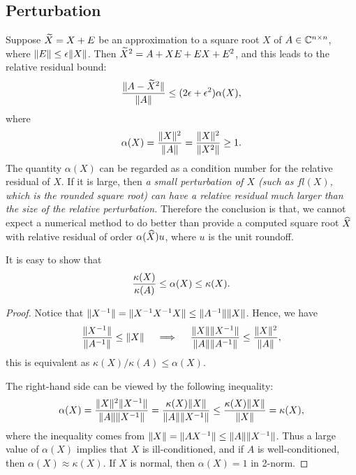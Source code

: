 \documentclass{article}
\begin{document}
\subsection{Perturbation}
Suppose $\widetilde X = X + E$ be an approximation to a square root $X$ of
$A\in\mathbb{C}^{n\times n}$, where $\|{E}\| \le \epsilon\|{X}\|$. Then $\widetilde X^2 = A + XE
+ EX + E^2$, and this leads to the relative residual bound:
\begin{equation}\notag
  \frac{\|{A - \widetilde X^2}\|}{\|{A}\|} \leq (2\epsilon +
  \epsilon^2)\alpha(X), 
\end{equation}
where
\begin{equation}\label{eq:rel-residual-err-bound}
  \alpha(X) = \frac{\|{X}\|^2}{\|{A}\|} = \frac{\|{X}\|^2}{\|{X^2}\|}
  \ge 1. 
\end{equation}
The quantity $\alpha(X)$ can be regarded as a condition number for the
relative residual of $X$. If it is large, then \emph{a small perturbation
  of $X$ (such as $fl(X)$, which is the rounded square root) can have a
  relative residual much larger than the size of the relative perturbation.} 
Therefore the conclusion is that, we cannot expect a numerical method to do
better than provide a computed square root $\widehat X$ with relative residual
of order $\alpha(\widehat X) u$, where $u$ is the unit roundoff.

It is easy to show that 
\begin{equation}\notag
  \frac{\kappa(X)}{\kappa(A)} \leq \alpha(X) \leq \kappa(X).
\end{equation}
\begin{proof}
  Notice that $\|{X^{-1}}\| = \|{X^{-1} X^{-1} X}\| \le
  \|{A^{-1}}\|\|{X}\|$. Hence, we have 
\begin{equation}\notag
  \frac{\|{X^{-1}}\|}{\|{A^{-1}}\|} \le \|{X}\| \quad \implies 
\quad \frac{\|{X}\|\|{X^{-1}}\|}{\|{A}\|\|{A^{-1}}\|} \le
\frac{\|{X}\|^2}{\|{A}\|},
\end{equation}
this is equivalent as $\kappa(X)/\kappa(A)\le \alpha(X)$.

The right-hand side can be viewed by the following inequality:
\begin{equation}\notag
  \alpha(X) = \frac{\|{X}\|^2\|{X^{-1}}\|}{\|{A}\|\|{X^{-1}}\|} =
  \frac{\kappa(X)\|{X}\|}{\|{A}\|\|{X^{-1}}\|} \le
  \frac{\kappa(X)\|{X}\|}{\|{X}\|} = \kappa(X),
\end{equation}
where the inequality comes from $\|{X}\| = \|{AX^{-1}}\| \le
\|{A}\|\|{X^{-1}}\|$. Thus a large value of $\alpha(X)$ implies that $X$
is ill-conditioned, and if $A$ is well-conditioned, then $\alpha(X) \approx
\kappa(X)$. If $X$ is normal, then $\alpha(X) = 1$ in 2-norm.
\end{proof}
\end{document}
